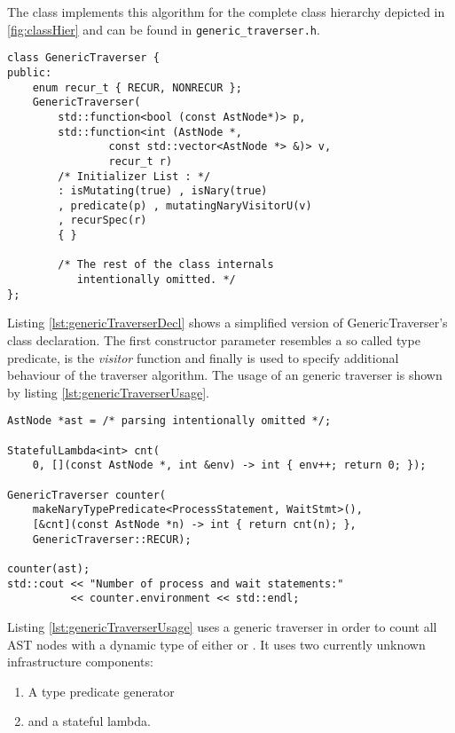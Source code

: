The class  implements this algorithm for the
complete class hierarchy depicted in \ref{fig:classHier} and can be
found in \texttt{generic_traverser.h}.
%
\begin{lstlisting}[style=c++,caption={Interface definition of the
      GenericTraverser class},label={lst:genericTraverserDecl}]
class GenericTraverser {
public:
    enum recur_t { RECUR, NONRECUR };
    GenericTraverser(
        std::function<bool (const AstNode*)> p,
        std::function<int (AstNode *,
                const std::vector<AstNode *> &)> v,
                recur_t r)
        /* Initializer List : */
        : isMutating(true) , isNary(true)
        , predicate(p) , mutatingNaryVisitorU(v)
        , recurSpec(r)
        { }

        /* The rest of the class internals
           intentionally omitted. */
};
\end{lstlisting}
%
Listing \ref{lst:genericTraverserDecl} shows a simplified version of
GenericTraverser's class declaration. The first constructor parameter
 resembles a so called type predicate,  is the
\emph{visitor} function and finally  is used to specify
additional behaviour of the traverser algorithm. The usage of an
generic traverser is shown by listing \ref{lst:genericTraverserUsage}.
%
\begin{lstlisting}[style=c++,caption={Example usage of an
      GenericTraverser object},label={lst:genericTraverserUsage}]
AstNode *ast = /* parsing intentionally omitted */;

StatefulLambda<int> cnt(
    0, [](const AstNode *, int &env) -> int { env++; return 0; });

GenericTraverser counter(
    makeNaryTypePredicate<ProcessStatement, WaitStmt>(),
    [&cnt](const AstNode *n) -> int { return cnt(n); },
    GenericTraverser::RECUR);

counter(ast);
std::cout << "Number of process and wait statements:"
          << counter.environment << std::endl;
\end{lstlisting}
%
Listing \ref{lst:genericTraverserUsage} uses a generic traverser
in order to count all AST nodes with a dynamic type of either
 or . It uses two currently
unknown infrastructure components:
%
\begin{enumerate}
    \item A type predicate generator
    \item and a stateful lambda.
\end{enumerate}
